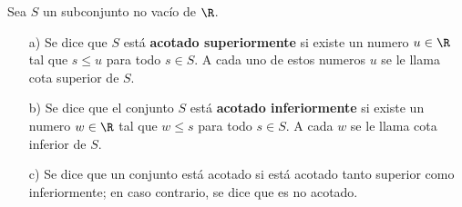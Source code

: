 \begin{definition}
	Sea \(S \) un subconjunto no vacío de \(\R \).
	
	\begin{enumerate}
		\item[a)] Se dice que \(S \) está \textbf{acotado superiormente} si existe un numero \(u \in \R \) tal que \(s \leq u \) para todo \(s \in S\). A cada uno de estos numeros \(u \) se le llama cota superior de \(S \).
			
			\item[b)]Se dice que el conjunto \(S \) está \textbf{acotado inferiormente} si existe un numero \(w \in \R \) tal que \(w \leq s \) para todo \(s \in S \). A cada \(w \) se le llama cota inferior de \(S \).
			
		\item[c)] Se dice que un conjunto está acotado si está acotado tanto superior como inferiormente; en caso contrario, se dice que es no acotado.
	\end{enumerate}
\end{definition}

